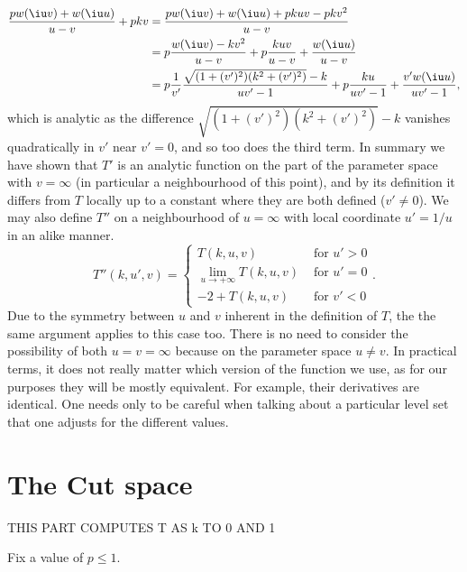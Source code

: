 \begin{align}
\frac{p w(\iu v) + w(\iu u)}{u-v} + p k v
&= \frac{pw(\iu v) + w(\iu u) + pkuv - pkv^2}{u-v} \\
&= p \frac{w(\iu v) - kv^2}{u-v} + p \frac{kuv}{u-v} + \frac{w(\iu u)}{u-v} \\
&= p \frac{1}{v'}\frac{\sqrt{(1+(v')^2)(k^2 + (v')^2)} - k }{uv'-1} + p \frac{ku}{uv'-1} + \frac{v' w(\iu u)}{uv'-1},
\end{align}
which is analytic as the difference $\sqrt{(1+(v')^2)(k^2 + (v')^2)} - k$ vanishes quadratically in $v'$ near $v'=0$, and so too does the third term. In summary we have shown that $T'$ is an analytic function on the part of the parameter space with $v=\infty$ (in particular a neighbourhood of this point), and by its definition it differs from $T$ locally up to a constant where they are both defined ($v' \neq 0$). We may also define $T''$ on a neighbourhood of $u = \infty$ with local coordinate $u' = 1/u$ in an alike manner.
\[
T''(k,u',v) =
\begin{cases}
T(k,u, v) & \text{ for } u' > 0 \\
\lim_{u\to +\infty} T(k,u,v) & \text{ for } u' = 0 \\
-2 + T(k,u, v) & \text{ for } v' < 0
\end{cases}.
\]
Due to the symmetry between $u$ and $v$ inherent in the definition of $T$, the the same argument applies to this case too. There is no need to consider the possibility of both $u=v=\infty$ because on the parameter space $u\neq v$. In practical terms, it does not really matter which version of the function we use, as for our purposes they will be mostly equivalent. For example, their derivatives are identical. One needs only to be careful when talking about a particular level set that one adjusts for the different values.















\section{The Cut space}
THIS PART COMPUTES T AS k TO 0 AND 1

Fix a value of $p \leq 1$.

